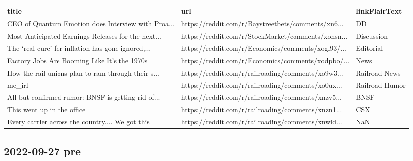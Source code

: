 \documentclass{book}
\begin{document}
  
  
  \begin{table}[htbp]%
  \centering%
  \begin{adjustbox}{width=1\textwidth}%
  \begin{tabular}{lll}
  \toprule
                                               title &                                                url &  linkFlairText \\
  \midrule
  CEO of Quantum Emotion does Interview with Proa... & https://reddit.com/r/Baystreetbets/comments/xn6... &             DD \\
  Most Anticipated Earnings Releases for the next... & https://reddit.com/r/StockMarket/comments/xohsn... &     Discussion \\
  The ‘real cure’ for inflation has gone ignored,... & https://reddit.com/r/Economics/comments/xogl93/... &      Editorial \\
        Factory Jobs Are Booming Like It’s the 1970s & https://reddit.com/r/Economics/comments/xodpbo/... &           News \\
  How the rail unions plan to ram through their s... & https://reddit.com/r/railroading/comments/xo9w3... &  Railroad News \\
                                              me_irl & https://reddit.com/r/railroading/comments/xo0ux... & Railroad Humor \\
  All but confirmed rumor: BNSF is getting rid of... & https://reddit.com/r/railroading/comments/xnzv5... &           BNSF \\
                          This went up in the office & https://reddit.com/r/railroading/comments/xnzn1... &            CSX \\
    Every carrier across the country.... We got this & https://reddit.com/r/railroading/comments/xnwid... &            NaN \\
  \bottomrule
  \end{tabular}
  \end{adjustbox}%
  \end{table}
  
  
  

  
  \subsection{ 2022-09-27 pre }
  \normalsize%
  
\end{document}

